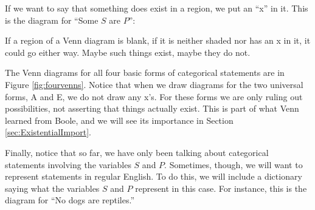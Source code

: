 \begin{center}
\end{center}


If we want to say that something does exist in a region, we put an ``x'' in it. This is the diagram for ``Some $S$ are $P$'': 

\begin{center}
\end{center}

If a region of a Venn diagram is blank, if it is neither shaded nor has an x in it, it could go either way. Maybe such things exist, maybe they do not.

The Venn diagrams for all four basic forms of categorical statements are in Figure \ref{fig:fourvenns}. Notice that when we draw diagrams for the two universal forms, A and E, we do not draw any x's. For these forms we are only ruling out possibilities, not asserting that things actually exist. This is part of what Venn learned from Boole, and we will see its importance in Section \ref{sec:ExistentialImport}. 

Finally, notice that so far, we have only been talking about categorical statements involving the variables $S$ and $P$. Sometimes, though, we will want to represent statements in regular English. To do this, we will include a dictionary saying what the variables $S$ and $P$ represent in this case. For instance, this is the diagram for ``No dogs are reptiles.''

